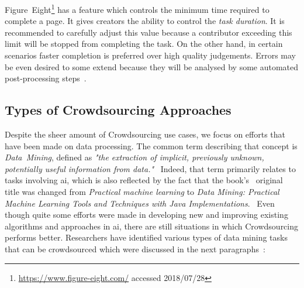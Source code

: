 Figure~Eight\footnote{\url{https://www.figure-eight.com/} accessed 2018/07/28} has a feature which controls the minimum time required to complete a page. It gives creators the ability to control the \emph{task duration}. It is recommended to carefully adjust this value because a contributor exceeding this limit will be stopped from completing the task. On the other hand, in certain scenarios faster completion is preferred over high quality judgements. Errors may be even desired to some extend because they will be analysed by some automated post-processing steps~\cite{krishna2016}. 

\subsection{Types of Crowdsourcing Approaches}
Despite the sheer amount of Crowdsourcing use cases, we focus on efforts that have been made on data processing. The common term describing that concept is \emph{Data~Mining}, defined as \emph{"the extraction of implicit, previously unknown, potentially useful information from data."}~\cite{witten2016}
Indeed, that term primarily relates to tasks involving \gls{ai}, which is also reflected by the fact that the book's~\cite{witten2000} original title was changed from \emph{Practical machine learning} to \emph{Data Mining: Practical Machine Learning Tools and Techniques with Java Implementations}.~\cite{bouckaert2010} Even though quite some efforts were made in developing new and improving existing algorithms and approaches in \gls{ai}, there are still situations in which Crowdsourcing performs better. Researchers have identified various types of data mining tasks that can be crowdsourced which were discussed in the next paragraphs~\cite{xintong2014, barbier2012, sabou2012}:

